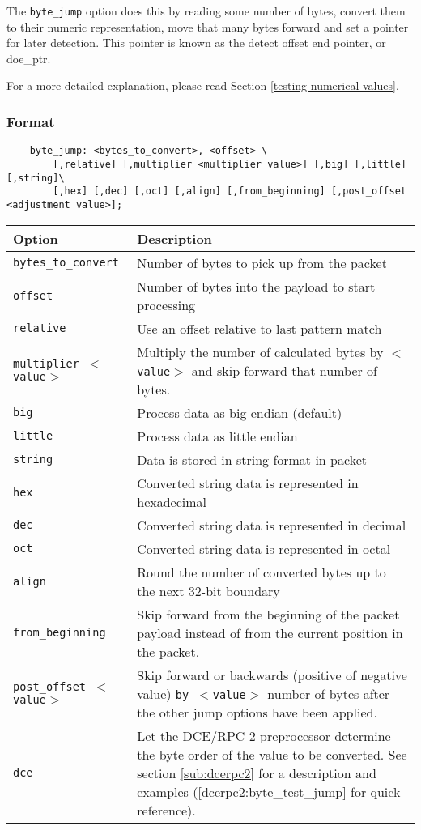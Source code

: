 \documentclass[english]{report}
\begin{document}
The \texttt{byte\_jump} option does this by reading some number of bytes,
convert them to their numeric representation, move that many bytes forward and
set a pointer for later detection.  This pointer is known as the detect offset
end pointer, or doe\_ptr.

For a more detailed explanation, please read Section \ref{testing numerical
values}.

\subsubsection{Format}

\begin{verbatim}
    byte_jump: <bytes_to_convert>, <offset> \
        [,relative] [,multiplier <multiplier value>] [,big] [,little][,string]\
        [,hex] [,dec] [,oct] [,align] [,from_beginning] [,post_offset <adjustment value>];
\end{verbatim}

\begin{tabular}{| l | p{4.5in} |}
\hline
{\bf Option} & {\bf Description}\\
\hline
\hline
\texttt{bytes\_to\_convert} & Number of bytes to pick up from the packet\\
\hline
\texttt{offset} & Number of bytes into the payload to start processing\\
\hline
\texttt{relative} & Use an offset relative to last pattern match\\
\hline
\texttt{multiplier $<$value$>$} & Multiply the number of calculated bytes by
\texttt{$<$value$>$} and skip forward that number of bytes.\\
\hline
\texttt{big} & Process data as big endian (default)\\
\hline
\texttt{little} & Process data as little endian\\
\hline
\texttt{string} & Data is stored in string format in packet\\
\hline
\texttt{hex} & Converted string data is represented in hexadecimal\\
\hline
\texttt{dec} & Converted string data is represented in decimal\\
\hline
\texttt{oct} & Converted string data is represented in octal\\
\hline
\texttt{align} & Round the number of converted bytes up to the next 32-bit boundary\\
\hline
\texttt{from\_beginning} & Skip forward from the beginning of the packet
payload instead of from the current position in the packet.\\
\hline
\texttt{post\_offset $<$value$>$} & Skip forward or backwards (positive of
negative value) \texttt{by $<$value$>$} number of bytes after the other jump
options have been applied.\\
\hline
\texttt{dce} & Let the DCE/RPC 2 preprocessor determine the byte order of the
value to be converted.  See section \ref{sub:dcerpc2} for a description and
examples (\ref{dcerpc2:byte_test_jump} for quick reference).\\ \hline
\end{tabular}
\end{document}
